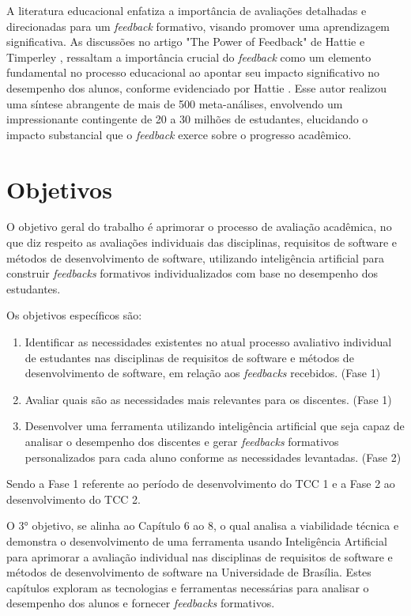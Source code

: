 A literatura educacional enfatiza a importância de avaliações detalhadas e direcionadas para um \textit{feedback} formativo, visando promover uma aprendizagem significativa. As discussões no artigo "The Power of Feedback" de Hattie e Timperley \cite{hattie2007}, ressaltam a importância crucial do \textit{feedback} como um elemento fundamental no processo educacional ao apontar seu impacto significativo no desempenho dos alunos, conforme evidenciado por Hattie \cite{hattie2007}. Esse autor realizou uma síntese abrangente de mais de 500 meta-análises, envolvendo um impressionante contingente de 20 a 30 milhões de estudantes, elucidando o impacto substancial que o \textit{feedback} exerce sobre o progresso acadêmico. 

\section{Objetivos}

O objetivo geral do trabalho  é aprimorar o processo de avaliação acadêmica, no que diz respeito as avaliações individuais das disciplinas, requisitos de software e métodos de desenvolvimento de software, utilizando inteligência artificial para construir \textit{feedbacks} formativos individualizados com base no desempenho dos estudantes.

Os objetivos específicos são:

\begin{enumerate}
  \item Identificar as necessidades existentes no atual processo avaliativo individual de estudantes nas disciplinas de requisitos de software e métodos de desenvolvimento de software, em relação aos \textit{feedbacks} recebidos. (Fase 1)
  \item Avaliar quais são as necessidades mais relevantes para os discentes. (Fase 1)
  \item Desenvolver uma ferramenta utilizando inteligência artificial que seja capaz de analisar o desempenho dos discentes e gerar \textit{feedbacks} formativos personalizados para cada aluno conforme as necessidades levantadas. (Fase 2)
\end{enumerate}

Sendo a Fase 1 referente ao período de desenvolvimento do TCC 1 e a Fase 2 ao desenvolvimento do TCC 2.

O 3° objetivo, se alinha ao Capítulo 6 ao 8, o qual analisa a viabilidade técnica e demonstra o desenvolvimento de uma ferramenta usando Inteligência Artificial para aprimorar a avaliação individual nas disciplinas de requisitos de software e métodos de desenvolvimento de software na Universidade de Brasília. Estes capítulos exploram as tecnologias e ferramentas necessárias para analisar o desempenho dos alunos e fornecer \textit{feedbacks} formativos.

